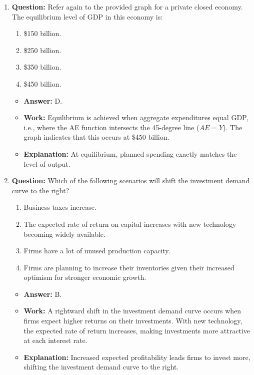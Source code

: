 \documentclass{article}
\begin{document}
\begin{enumerate}[label=\arabic*.]
  \item \textbf{Question:} Refer again to the provided graph for a private closed economy. The equilibrium level of GDP in this economy is:
    \begin{enumerate}[label=(\Alph*)]
      \item \$150 billion.
      \item \$250 billion.
      \item \$350 billion.
      \item \$450 billion.
    \end{enumerate}
    \begin{itemize}
      \item \textbf{Answer:} D.
      \item \textbf{Work:} Equilibrium is achieved when aggregate expenditures equal GDP, i.e., where the AE function intersects the 45-degree line (\(AE = Y\)). The graph indicates that this occurs at \$450 billion.
      \item \textbf{Explanation:} At equilibrium, planned spending exactly matches the level of output.
    \end{itemize}

  \item \textbf{Question:} Which of the following scenarios will shift the investment demand curve to the right?
    \begin{enumerate}[label=(\Alph*)]
      \item Business taxes increase.
      \item The expected rate of return on capital increases with new technology becoming widely available.
      \item Firms have a lot of unused production capacity.
      \item Firms are planning to increase their inventories given their increased optimism for stronger economic growth.
    \end{enumerate}
    \begin{itemize}
      \item \textbf{Answer:} B.
      \item \textbf{Work:} A rightward shift in the investment demand curve occurs when firms expect higher returns on their investments. With new technology, the expected rate of return increases, making investments more attractive at each interest rate.
      \item \textbf{Explanation:} Increased expected profitability leads firms to invest more, shifting the investment demand curve to the right.
    \end{itemize}
\end{enumerate}
\end{document}
